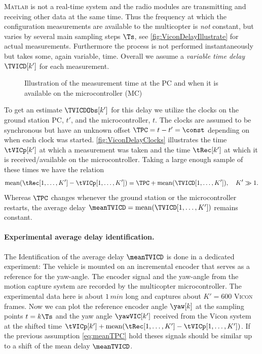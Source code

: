 \textsc{Matlab} is not a real-time system and the radio modules are transmitting and receiving other data at the same time.
Thus the frequency at which the configuration measurements are available to the multicopter is \textit{not} constant, but varies by several main sampling steps $\Ts$, see \autoref{fig:ViconDelayIllustrate} for actual measurements.
Furthermore the process is not performed instantaneously but takes some, again variable, time. 
Overall we assume a \textit{variable time delay} $\TVICD[k']$ for each measurement.

\begin{figure}[htb]
 \centering
 
 \caption{Illustration of the measurement time at the PC and when it is available on the microcontroller (MC)}
 \label{fig:ViconDelayClocks}
\end{figure}

To get an estimate $\TVICDObs[k']$ for this delay we utilize the clocks on the ground station PC, $t'$, and the microcontroller, $t$.
The clocks are assumed to be synchronous but have an unknown offset $\TPC = t - t' = \const$ depending on when each clock was started.
\autoref{fig:ViconDelayClocks} illustrates the time $\tVICp[k']$ at which a measurement was taken and the time $\tRec[k']$ at which it is received/available on the microcontroller.
Taking a large enough sample of these times we have the relation
\begin{align}\label{eq:meanTPC}
 \text{mean} (\tRec[1,\ldots,K'] - \tVICp[1,\ldots,K']) = \TPC + \text{mean}(\TVICD[1,\ldots,K']), \quad K'\gg 1.
\end{align}
Whereas $\TPC$ changes whenever the ground station or the microcontroller restarts, the average delay $\meanTVICD = \text{mean}(\TVICD[1,\ldots,K'])$ remains constant.

\paragraph{Experimental average delay identification.}
The Identification of the average delay $\meanTVICD$ is done in a dedicated experiment:
The vehicle is mounted on an incremental encoder that serves as a reference for the yaw-angle.
The encoder signal and the yaw-angle from the motion capture system are recorded by the multicopter microcontroller.
The experimental data here is about $1\,\unit{min}$ long and captures about $K' = 600$ \textsc{Vicon} frames.
Now we can plot the reference encoder angle $\yaw[k]$ at the sampling points $t = k\Ts$ and the yaw angle $\yawVIC[k']$ received from the Vicon system at the shifted time $\tVICp[k'] + \text{mean}(\tRec[1,\ldots,K'] - \tVICp[1,\ldots,K'])$.
If the previous assumption \eqref{eq:meanTPC} hold theses signals should be similar up to a shift of the mean delay $\meanTVICD$.

